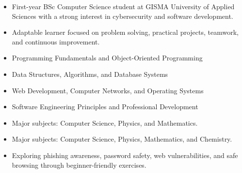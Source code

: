 \documentclass[9pt,a4paper]{altacv}
\begin{document}


\begin{fullwidth}
\makecvheader
\end{fullwidth}

\begin{itemize}
\item First-year BSc Computer Science student at GISMA University of Applied Sciences with a strong interest in cybersecurity and software development.
\item Adaptable learner focused on problem solving, practical projects, teamwork, and continuous improvement.
\end{itemize}

\begin{itemize}
\item Programming Fundamentals and Object-Oriented Programming
\item Data Structures, Algorithms, and Database Systems
\item Web Development, Computer Networks, and Operating Systems
\item Software Engineering Principles and Professional Development
\end{itemize}

\divider
{}
\begin{itemize}
\item Major subjects: Computer Science, Physics, and Mathematics.
\end{itemize}

\divider
{}
\begin{itemize}
\item Major subjects: Computer Science, Physics, Mathematics, and Chemistry.
\end{itemize}

\begin{itemize}
\item Exploring phishing awareness, password safety, web vulnerabilities, and safe browsing through beginner-friendly exercises.
\end{itemize}
\end{document}
